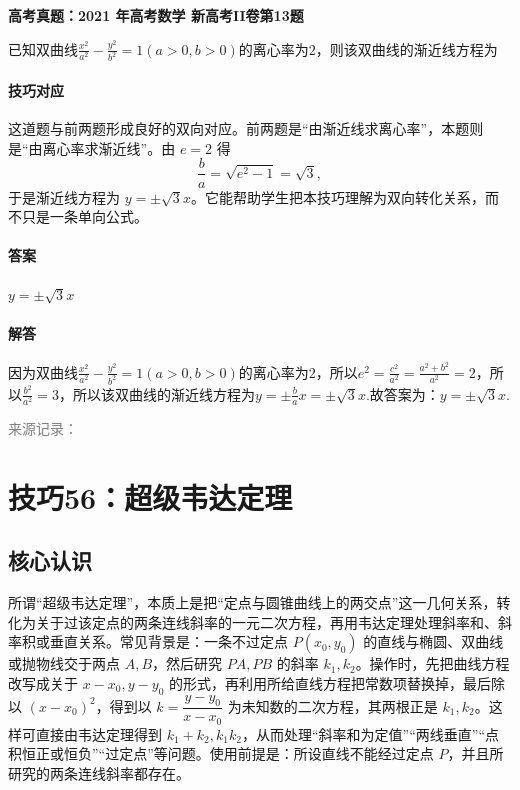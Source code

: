 \documentclass[UTF8,a4paper,11pt]{ctexart}
\newenvironment{gaokao}[1]{\par\medskip\noindent\textbf{高考真题：#1}\par\smallskip}{\par\medskip}
\begin{document}
\begin{gaokao}{2021 年高考数学 新高考II卷第13题}

已知双曲线$\frac{x^2}{a^2}-\frac{y^2}{b^2}=1(a>0,b>0)$的离心率为$2$，则该双曲线的渐近线方程为\underline{\hspace{3cm}}

\paragraph{技巧对应}

这道题与前两题形成良好的双向对应。前两题是“由渐近线求离心率”，本题则是“由离心率求渐近线”。由 $e=2$ 得
\[
\frac{b}{a}=\sqrt{e^2-1}=\sqrt{3},
\]
于是渐近线方程为 $y=\pm\sqrt{3}x$。它能帮助学生把本技巧理解为双向转化关系，而不只是一条单向公式。

\paragraph{答案}

$y=\pm\sqrt{3}x$

\paragraph{解答}

因为双曲线$\frac{x^2}{a^2}-\frac{y^2}{b^2}=1(a>0,b>0)$的离心率为$2$，所以$e^2=\frac{c^2}{a^2}=\frac{a^2+b^2}{a^2}=2$，所以$\frac{b^2}{a^2}=3$，所以该双曲线的渐近线方程为$y=\pm\frac{b}{a}x=\pm\sqrt{3}x$.故答案为：$y=\pm\sqrt{3}x$.

\par\smallskip\textcolor{gray}{\footnotesize 来源记录：\texttt{}}

\end{gaokao}

\clearpage

\section{技巧56：超级韦达定理}

\subsection*{核心认识}

所谓“超级韦达定理”，本质上是把“定点与圆锥曲线上的两交点”这一几何关系，转化为关于过该定点的两条连线斜率的一元二次方程，再用韦达定理处理斜率和、斜率积或垂直关系。常见背景是：一条不过定点 $P(x_0,y_0)$ 的直线与椭圆、双曲线或抛物线交于两点 $A,B$，然后研究 $PA,PB$ 的斜率 $k_1,k_2$。操作时，先把曲线方程改写成关于 $x-x_0,y-y_0$ 的形式，再利用所给直线方程把常数项替换掉，最后除以 $(x-x_0)^2$，得到以 $k=\dfrac{y-y_0}{x-x_0}$ 为未知数的二次方程，其两根正是 $k_1,k_2$。这样可直接由韦达定理得到 $k_1+k_2,k_1k_2$，从而处理“斜率和为定值”“两线垂直”“点积恒正或恒负”“过定点”等问题。使用前提是：所设直线不能经过定点 $P$，并且所研究的两条连线斜率都存在。
\end{document}
